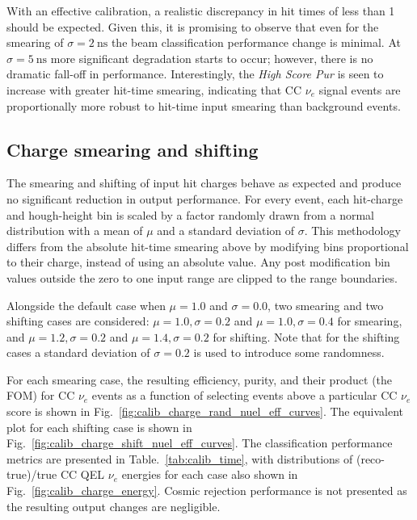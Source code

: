 With an effective calibration, a realistic discrepancy in hit times of less than
\unit{1}{} should be expected. Given this, it is promising to observe that even for the
smearing of $\sigma=2~\text{ns}$ the beam classification performance change is minimal. At
$\sigma=5~\text{ns}$ more significant degradation starts to occur; however, there is no dramatic
fall-off in performance. Interestingly, the \emph{High Score Pur} is seen to increase with greater
hit-time smearing, indicating that CC $\nu_{e}$ signal events are proportionally more robust to
hit-time input smearing than background events.

\subsection{Charge smearing and shifting} %
\label{sec:results_robust_charge} %

The smearing and shifting of input hit charges behave as expected and produce no significant
reduction in output performance. For every event, each hit-charge and hough-height bin is scaled
by a factor randomly drawn from a normal distribution with a mean of $\mu$ and a standard
deviation of $\sigma$. This methodology differs from the absolute hit-time smearing above by
modifying bins proportional to their charge, instead of using an absolute value. Any post
modification bin values outside the zero to one input range are clipped to the range boundaries.

Alongside the default case when $\mu=1.0$ and $\sigma=0.0$, two smearing and two shifting cases
are considered: $\mu=1.0,\sigma=0.2$ and $\mu=1.0,\sigma=0.4$ for smearing, and
$\mu=1.2,\sigma=0.2$ and $\mu=1.4,\sigma=0.2$ for shifting. Note that for the shifting cases a
standard deviation of $\sigma=0.2$ is used to introduce some randomness.

For each smearing case, the resulting efficiency, purity, and their product (the FOM) for CC
$\nu_{e}$ events as a function of selecting events above a particular CC $\nu_{e}$ score is shown
in Fig.~\ref{fig:calib_charge_rand_nuel_eff_curves}. The equivalent plot for each shifting case is
shown in Fig.~\ref{fig:calib_charge_shift_nuel_eff_curves}. The classification performance metrics
are presented in Table.~\ref{tab:calib_time}, with distributions of (reco-true)/true CC QEL
$\nu_{e}$ energies for each case also shown in Fig.~\ref{fig:calib_charge_energy}. Cosmic
rejection performance is not presented as the resulting output changes are negligible.

